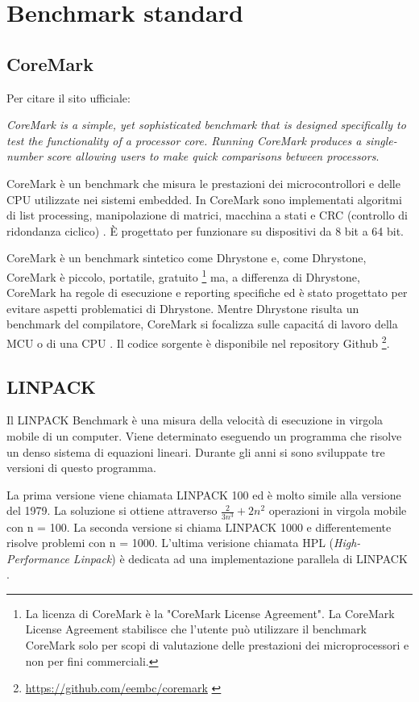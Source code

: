 \documentclass[12pt, a4paper]{report}
\begin{document}
\section{Benchmark standard}


\subsection{CoreMark}
Per citare il sito ufficiale: 

\textit{CoreMark is a simple, yet sophisticated benchmark that is designed specifically to test the functionality of a processor core. Running CoreMark produces a single-number score allowing users to make quick comparisons between processors}. 

CoreMark è un benchmark che misura le prestazioni dei microcontrollori e delle CPU utilizzate nei sistemi embedded. In CoreMark sono implementati algoritmi di list processing, manipolazione di matrici, macchina a stati e CRC (controllo di ridondanza ciclico) . È progettato per funzionare su dispositivi da 8 bit a 64 bit\cite{CoreMark}.

CoreMark è un benchmark sintetico come Dhrystone e, come Dhrystone, CoreMark è piccolo, portatile, gratuito \footnote{La licenza di CoreMark è la "CoreMark License Agreement". La CoreMark License Agreement stabilisce che l'utente può utilizzare il benchmark CoreMark solo per scopi di valutazione delle prestazioni dei microprocessori e non per fini commerciali.} ma, a differenza di Dhrystone, CoreMark ha regole di esecuzione e reporting specifiche ed è stato progettato per evitare aspetti problematici di Dhrystone. Mentre Dhrystone risulta un benchmark del compilatore, CoreMark si focalizza sulle capacit\'a di lavoro della MCU o di una CPU \cite{analysis_EEMBC}.
Il codice sorgente è disponibile nel repository Github \footnote{\url{https://github.com/eembc/coremark} \cite{RepoCoreMark}}.
		

\subsection{LINPACK}
Il LINPACK Benchmark è una misura della velocità di esecuzione in virgola mobile di un computer. Viene determinato eseguendo un programma che risolve un denso sistema di equazioni lineari. Durante gli anni si sono sviluppate tre versioni di questo programma. 

La prima versione viene chiamata LINPACK 100 ed è molto simile alla versione del 1979. La soluzione si ottiene attraverso $ \frac{2}{3n^3} + 2n^2 $ operazioni in virgola mobile con n = 100. La seconda versione si chiama LINPACK 1000 e differentemente risolve problemi con n = 1000. L'ultima verisione chiamata HPL (\textit{High-Performance Linpack}) è dedicata ad una implementazione parallela di LINPACK\cite{LINPACK_PastPresFut} \cite{hplNetLib}.
\end{document}
